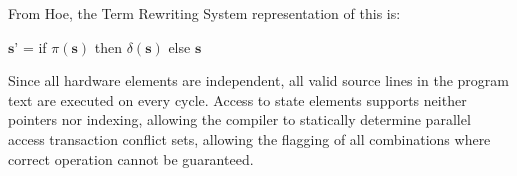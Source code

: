 From Hoe\cite{Hoe:Thesis}, the Term Rewriting System representation of this is:

$\textbf{s'}$ = if $\pi(\textbf{s})$ then $\delta(\textbf{s})$ else $\textbf{s}$

Since all hardware elements are independent, all valid source lines in the
program text are executed on every cycle.
Access to state elements supports neither pointers nor indexing, allowing the
compiler to statically determine parallel access transaction conflict sets,
allowing the flagging of all combinations where correct operation cannot
be guaranteed.
